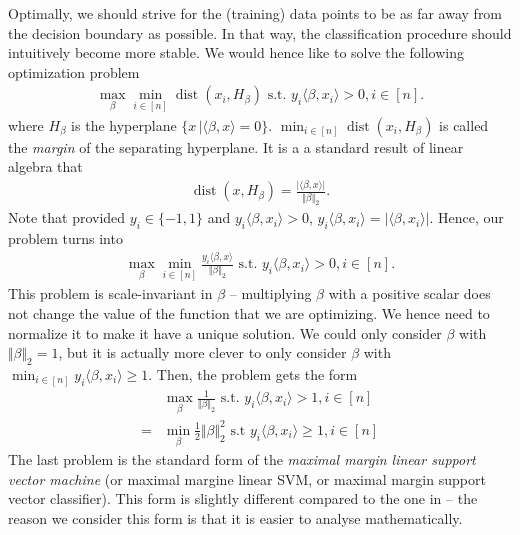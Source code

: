 \documentclass{article}
\newcommand{\sprod}[1]{\langle #1 \rangle}
\newcommand{\abs}[1]{\vert #1 \vert}
\newcommand{\norm}[1]{\Vert #1 \Vert}
\DeclareMathOperator{\dist}{dist}
\begin{document}
Optimally, we should strive for the (training) data points to be as far away from the decision boundary as possible. In that way, the classification procedure should intuitively become more stable. We would hence like to solve the following optimization problem
\begin{align*}
    \max_\beta \min_{i \in [n]} \dist(x_i,H_\beta) \text{ s.t. } y_i \sprod{\beta,x_i}>0, i \in [n].
\end{align*}
where $H_\beta$ is the hyperplane $\{x \, \vert \sprod{\beta,x}=0\}$. $ \min_{i \in [n]} \dist(x_i,H_\beta)$ is called the \emph{margin} of the separating hyperplane. It is a a standard result of linear algebra  that
\begin{align*}
    \dist(x,H_\beta) = \frac{\abs{\sprod{\beta,x}}}{\norm{\beta}_2}.
\end{align*}
Note that provided $y_i \in \{-1,1\}$ and $y_i\sprod{\beta,x_i}>0$, $y_i\sprod{\beta,x_i} = \abs{\sprod{\beta,x_i}}$. Hence, our problem turns into
\begin{align*}
    \max_\beta \min_{i \in [n]}\frac{y_i\sprod{\beta,x}}{\norm{\beta}_2}\text{ s.t. } y_i \sprod{\beta,x_i}>0, i \in [n].
\end{align*}
This problem is scale-invariant in $\beta$ -- multiplying $\beta$ with a positive scalar does not change the value of the function that we are optimizing. We hence need to normalize it to make it have a unique solution. We could only consider $\beta$ with $\norm{\beta}_2=1$, but it is actually more clever to only consider $\beta$ with $\min_{i \in [n]} y_i \sprod{\beta,x_i}\geq 1$. Then, the problem gets the form
\begin{align}
    & \max_\beta \frac{1}{\norm{\beta}_2}\text{ s.t. } y_i\sprod{\beta,x_i}>1, i \in [n] \nonumber \\
     =& \min_\beta \tfrac{1}{2}\norm{\beta}_2^2 \text{ s.t } y_i\sprod{\beta,x_i}\geq 1, i \in [n] \label{eq:SVM}
\end{align}
The last problem is the standard form of the \emph{maximal margin linear support vector machine} (or maximal margine linear SVM, or maximal margin support vector classifier). This form is slightly different compared to the one in \cite{james2023introduction} -- the reason we consider this form is that it is easier to analyse mathematically.
\end{document}
